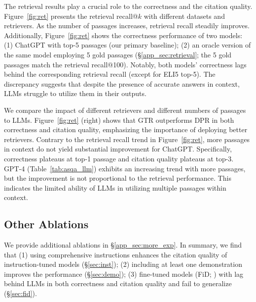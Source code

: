 \documentclass[11pt]{article}
\newcommand{\vani}{{\sc{Vanilla}}}
\newcommand{\posthoc}{{\sc{PostCite}}}
\newcommand{\revise}[1]{{{#1}}}
\begin{document}


The retrieval results play a crucial role to the correctness and the citation quality.
Figure~\ref{fig:ret} presents 
the retrieval recall@$k$ %
with different datasets and retrievers.
As the number of passages increases, retrieval recall steadily improves.
Additionally, Figure~\ref{fig:ret} shows
the correctness performance of two models:
(1) ChatGPT \vani{} with top-5 passages (our primary baseline);
(2) an oracle version of the same model employing
5 gold passages (\S\ref{app_sec:retrieval}; the 5 gold passages match the retrieval recall@100).
Notably,
both models' correctness lags behind the corresponding retrieval recall (except for ELI5 top-5).
The discrepancy suggests that 
despite the presence of accurate answers in context,
LLMs struggle to utilize  them in their outputs.



We compare the impact of different retrievers and different numbers of passages to LLMs.
Figure~\ref{fig:ret} (right)
shows that
GTR outperforms DPR in both correctness and citation quality,
emphasizing  the importance of deploying better retrievers.
Contrary to the  retrieval recall trend  in Figure~\ref{fig:ret},
more passages in context do not yield substantial improvement for ChatGPT.
Specifically, correctness plateaus at top-1 passage and citation quality plateaus at top-3. 
\revise{GPT-4 (Table~\ref{tab:asqa_llm}) exhibits an increasing trend with more passages, 
but the improvement is not proportional to the retrieval performance.}
This  indicates the limited ability of LLMs in  utilizing multiple passages within context.

\subsection{Other Ablations}
\label{sec:other_ablation}

We provide additional ablations in \S\ref{app_sec:more_exp}. 
In summary, we find that 
(1) 
using comprehensive instructions
 enhances the citation quality of instruction-tuned models (\S\ref{sec:inst});
(2) 
including at least one demonstration improves the performance %
(\S\ref{sec:demo}); 
\revise{(3) fine-tuned models (FiD; \citealp{izacard-grave-2021-leveraging}) with \posthoc{} lag behind LLMs in both correctness and citation quality and fail to generalize %
(\S\ref{sec:fid}).}
\end{document}
